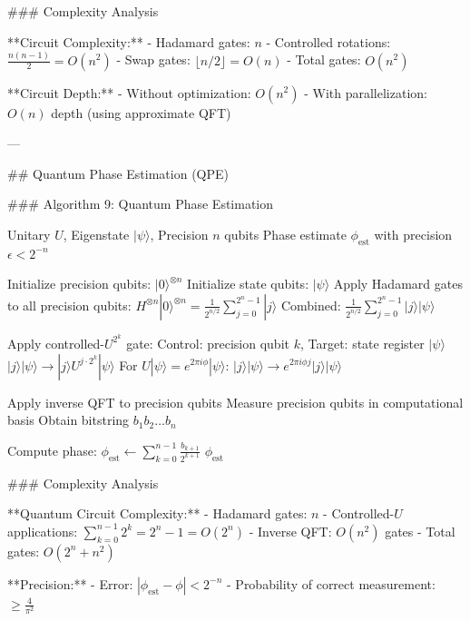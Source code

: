 ### Complexity Analysis

**Circuit Complexity:**
- Hadamard gates: $n$
- Controlled rotations: $\frac{n(n-1)}{2} = O(n^2)$
- Swap gates: $\lfloor n/2 \rfloor = O(n)$
- Total gates: $O(n^2)$

**Circuit Depth:**
- Without optimization: $O(n^2)$
- With parallelization: $O(n)$ depth (using approximate QFT)

---

## Quantum Phase Estimation (QPE)

### Algorithm 9: Quantum Phase Estimation

\begin{algorithm}
\caption{Quantum Phase Estimation (QPE)}
\begin{algorithmic}[1]
\REQUIRE Unitary $U$, Eigenstate $|\psi\rangle$, Precision $n$ qubits
\ENSURE Phase estimate $\phi_{\text{est}}$ with precision $\epsilon < 2^{-n}$

\STATE Initialize precision qubits: $|0\rangle^{\otimes n}$
\STATE Initialize state qubits: $|\psi\rangle$
\STATE Apply Hadamard gates to all precision qubits:
\STATE \quad $H^{\otimes n} |0\rangle^{\otimes n} = \frac{1}{2^{n/2}} \sum_{j=0}^{2^n-1} |j\rangle$
\STATE Combined: $\frac{1}{2^{n/2}} \sum_{j=0}^{2^n-1} |j\rangle |\psi\rangle$

    \STATE Apply controlled-$U^{2^k}$ gate:
    \STATE \quad Control: precision qubit $k$, Target: state register $|\psi\rangle$
    \STATE \quad $|j\rangle |\psi\rangle \to |j\rangle U^{j \cdot 2^k} |\psi\rangle$
    \STATE \quad For $U|\psi\rangle = e^{2\pi i \phi}|\psi\rangle$: $|j\rangle |\psi\rangle \to e^{2\pi i \phi j} |j\rangle |\psi\rangle$
\ENDFOR

\STATE Apply inverse QFT to precision qubits
\STATE Measure precision qubits in computational basis
\STATE Obtain bitstring $b_1 b_2 \ldots b_n$

\STATE Compute phase: $\phi_{\text{est}} \gets \sum_{k=0}^{n-1} \frac{b_{k+1}}{2^{k+1}}$
\RETURN $\phi_{\text{est}}$
\end{algorithmic}
\end{algorithm}

### Complexity Analysis

**Quantum Circuit Complexity:**
- Hadamard gates: $n$
- Controlled-$U$ applications: $\sum_{k=0}^{n-1} 2^k = 2^n - 1 = O(2^n)$
- Inverse QFT: $O(n^2)$ gates
- Total gates: $O(2^n + n^2)$

**Precision:**
- Error: $|\phi_{\text{est}} - \phi| < 2^{-n}$
- Probability of correct measurement: $\geq \frac{4}{\pi^2}$

